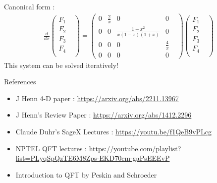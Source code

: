 \documentclass[11pt]{beamer}
\begin{document}
\begin{frame}
	Canonical form : 
	\begin{align*}
		\frac{d}{dx}\begin{pmatrix}
			F_1& \\
			F_2& \\
			F_3& \\
			F_4& \\
		\end{pmatrix}=\begin{pmatrix}
			0& \frac{2}{x}& 0& 0&\\
			0& 0& \frac{1+x^2}{x(1-x)(1+x)}& 0& \\
			0& 0& 0& \frac{4}{x}& \\
			0& 0& 0& 0&
		\end{pmatrix}
		\begin{pmatrix}
			F_1& \\
			F_2& \\
			F_3& \\
			F_4& \\
		\end{pmatrix}
	\end{align*}
This system can be solved iteratively!
\end{frame}
\begin{frame}{References}
	\begin{itemize}
		\item J Henn 4-D paper : \url{https://arxiv.org/abs/2211.13967}
		\item J Henn's Review Paper : \url{https://arxiv.org/abs/1412.2296}
		\item Claude Duhr's SageX Lectures : \url{https://youtu.be/f1QeB9vPLcg}
		\item NPTEL QFT lectures : \url{https://youtube.com/playlist?list=PLyqSpQzTE6M8Zps-EKD70cm-gaPsEEEvP}
		\item Introduction to QFT by Peskin and Schroeder
	\end{itemize}
\end{frame}
\end{document}
